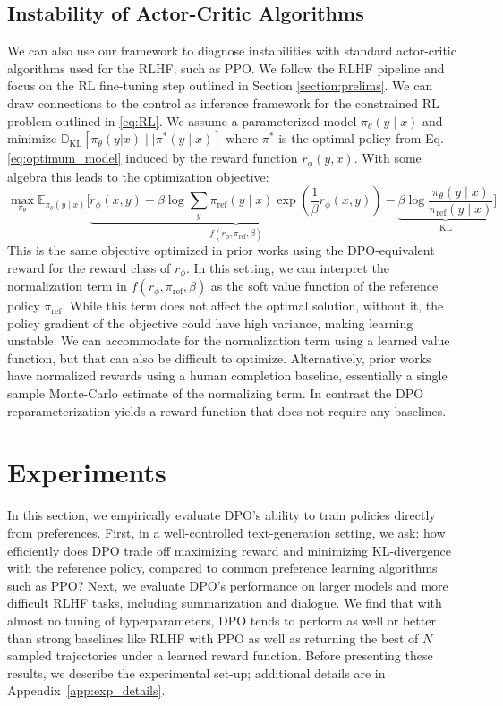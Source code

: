 \documentclass{article}
\newcommand{\piref}{\pi_\text{ref}}
\begin{document}
\subsection{Instability of Actor-Critic Algorithms}
We can also use our framework to diagnose instabilities with standard actor-critic algorithms used for the RLHF, such as PPO. We follow the RLHF pipeline and focus on the RL fine-tuning step outlined in Section \ref{section:prelims}. We can draw connections to the control as inference framework \cite{levine2018reinforcement} for the constrained RL problem outlined in \ref{eq:RL}. We assume a parameterized model $\pi_{\theta}(y\mid x)$ and minimize $\mathbb{D}_{\text{KL}}[\pi_{\theta}(y|x) \mid \mid \pi^*(y\mid x)]$ where $\pi^*$ is the optimal policy from Eq. \ref{eq:optimum_model} induced by the reward function $r_{\phi}(y, x)$. With some algebra this leads to the optimization objective:
\begin{equation}\label{eq:AC}
    \max_{\pi_{\theta}}\mathbb{E}_{\pi_{\theta}(y\mid x)}\bigg[\underbrace{r_{\phi}(x, y) -\beta\log\sum_{y}\piref(y\mid x)\exp\left(\frac{1}{\beta}r_{\phi}(x, y)\right)}_{f(r_{\phi}, \piref, \beta)} - \underbrace{\beta\log\frac{\pi_{\theta}(y\mid x)}{\piref(y\mid x)}}_{\text{KL}}\bigg]
\end{equation}
This is the same objective optimized in prior works 
\citep{ziegler2020finetuning, stiennon2022learning, bai2022training, ouyang2022training} using the DPO-equivalent reward for the reward class of $r_{\phi}$. In this setting, we can interpret the normalization term in $f(r_{\phi}, \piref, \beta)$ as the soft value function of the reference policy $\piref$. While this term does not affect the optimal solution, without it, the policy gradient of the objective could have high variance, making learning unstable. We can accommodate for the normalization term using a learned value function, but that can also be difficult to optimize. Alternatively, prior works have normalized rewards using a human completion baseline, essentially a single sample Monte-Carlo estimate of the normalizing term. In contrast the DPO reparameterization yields a reward function that does not require any baselines. 


\section{Experiments}
In this section, we empirically evaluate DPO's ability to train policies directly from preferences. First, in a well-controlled text-generation setting, we ask: how efficiently does DPO trade off maximizing reward and minimizing KL-divergence with the reference policy, compared to common preference learning algorithms such as PPO? Next, we evaluate DPO's performance on larger models and more difficult RLHF tasks, including summarization and dialogue. We find that with almost no tuning of hyperparameters, DPO tends to perform as well or better than strong baselines like RLHF with PPO as well as returning the best of $N$ sampled trajectories under a learned reward function. Before presenting these results, we describe the experimental set-up; additional details are in Appendix~\ref{app:exp_details}.
\end{document}
